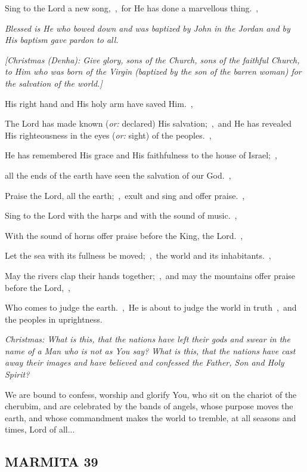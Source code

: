 \documentclass[12pt,twoside,a5paper]{article}
\newcommand{\marmita}[1]{\subsection*{MARMITA {#1}}}
\newcommand{\qanona}[1]{{\liturgicalhint{Qanona.} \emph{#1}}}
\newcommand{\slota}[1]{\liturgicalhint{Slota.} #1}
\newcommand{\translationoption}[1]{\emph{or:} #1}
\begin{document}
\begin{normalparskip}
  Sing to the Lord a new song,~\sep\ for He has done a marvellous thing.~\sep

  \qanona{Blessed is He who bowed down and was baptized by John in the Jordan and by His baptism gave pardon to all.}

  \emph{[Christmas (Denha): Give glory, sons of the Church, sons of the faithful Church, to Him who was born of the Virgin (baptized by the son of the barren woman) for the salvation of the world.]}

  His right hand and His holy arm have saved Him.~\sep

  The Lord has made known (\translationoption{declared}) His salvation;~\sep\ and He has revealed His righteousness in the eyes (\translationoption{sight}) of the peoples.~\sep

  He has remembered His grace and His faithfulness to the house of Israel;~\sep

  all the ends of the earth have seen the salvation of our God.~\sep

  Praise the Lord, all the earth;~\sep\ exult and sing and offer praise.~\sep

  Sing to the Lord with the harps and with the sound of music.~\sep

  With the sound of horns offer praise before the King, the Lord.~\sep

  Let the sea with its fullness be moved;~\sep\ the world and its inhabitants.~\sep

  May the rivers clap their hands together;~\sep\ and may the mountains offer praise before the Lord,~\sep

  Who comes to judge the earth.~\sep\ He is about to judge the world in truth~\sep\ and the peoples in uprightness.

  \emph{Christmas: What is this, that the nations have left their gods and swear in the name of a Man who is not as You say? What is this, that the nations have cast away their images and have believed and confessed the Father, Son and Holy Spirit?}
\end{normalparskip}

\slota{We are bound to confess, worship and glorify You, who sit on the chariot of the cherubim, and are celebrated by the bands of angels, whose purpose moves the earth, and whose commandment makes the world to tremble, at all seasons and times, Lord of all...}

\marmita{39}
\end{document}
